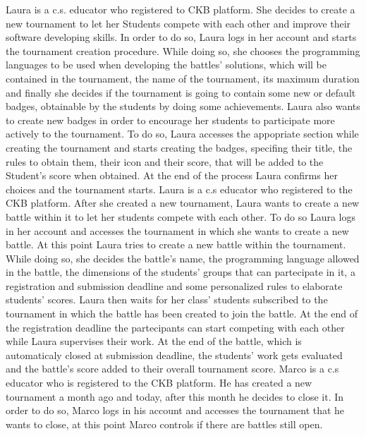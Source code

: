 \documentclass{article}
\newcounter{subsubsubsection}[subsubsection]
\begin{document}
{
Laura is a c.s. educator who registered to CKB platform. She decides to create a new tournament to let her Students compete with each other and improve their software developing skills. 
In order to do so, Laura logs in her account and starts the tournament creation procedure. 
While doing so, she chooses the programming languages to be used when developing the battles' solutions, which will be contained in the tournament, 
the name of the tournament, its maximum duration and finally she decides if the tournament is going to contain some new or default badges,
 obtainable by the students by doing some achievements.
Laura also wants to create new badges in order to encourage her students to participate more actively to the tournament. 
To do so, Laura accesses the appopriate section while creating the tournament and starts creating the badges, specifing their title, the rules to obtain them, their icon and their score, 
that will be added to the Student's score when obtained.
At the end of the process Laura confirms her choices and the tournament starts.
Laura is a c.s educator who registered to the CKB platform. After she created a new tournament, Laura wants to create a new battle within it to let her students compete with each other. 
To do so Laura logs in her account and accesses the tournament in which she wants to create a new battle. 
At this point Laura tries to create a new battle within the tournament. 
While doing so, she decides the battle's name, the programming language allowed in the battle, the dimensions of the students' groups that can partecipate in it, 
a registration and submission deadline and some personalized rules to elaborate students' scores.
Laura then waits for her class' students subscribed to the tournament in which the battle has been created to join the battle. 
At the end of the registration deadline the partecipants can start competing with each other while Laura supervises their work.
At the end of the battle, which is automaticaly closed at submission deadline, the students' work gets evaluated and the battle's score added to their overall tournament score.
Marco is a c.s educator who is registered to the CKB platform. He has created a new tournament a month ago and today, after this month he decides to close it. 
In order to do so, Marco logs in his account and accesses the tournament that he wants to close, at this point Marco controls if there are battles still open. 
}
\end{document}
